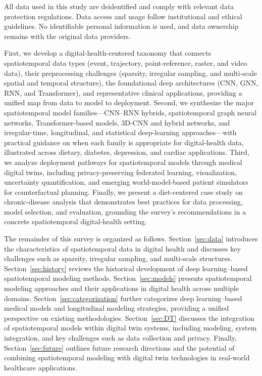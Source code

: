 \documentclass[acmsmall]{acmart}
\begin{document}
All data used in this study are deidentified and comply with relevant data protection regulations. Data access and usage follow institutional and ethical guidelines. No identifiable personal information is used, and data ownership remains with the original data providers.

First, we develop a digital-health-centered taxonomy that connects spatiotemporal data types (event, trajectory, point-reference, raster, and video data), their preprocessing challenges (sparsity, irregular sampling, and multi-scale spatial and temporal structure), the foundational deep architectures (CNN, GNN, RNN, and Transformer), and representative clinical applications, providing a unified map from data to model to deployment. Second, we synthesize the major spatiotemporal model families---CNN--RNN hybrids, spatiotemporal graph neural networks, Transformer-based models, 3D-CNN and hybrid networks, and irregular-time, longitudinal, and statistical deep-learning approaches---with practical guidance on when each family is appropriate for digital-health data, illustrated across dietary, diabetes, depression, and cardiac applications. Third, we analyze deployment pathways for spatiotemporal models through medical digital twins, including privacy-preserving federated learning, visualization, uncertainty quantification, and emerging world-model-based patient simulators for counterfactual planning. Finally, we present a diet-centered case study on chronic-disease analysis that demonstrates best practices for data processing, model selection, and evaluation, grounding the survey's recommendations in a concrete spatiotemporal digital-health setting.


The remainder of this survey is organized as follows. 
Section~\ref{sec:data} introduces the characteristics of spatiotemporal data in digital health and discusses key challenges such as sparsity, irregular sampling, and multi-scale structures. 
Section~\ref{sec:history} reviews the historical development of deep learning–based spatiotemporal modeling methods.
Section~\ref{sec:models} presents spatiotemporal modeling approaches and their applications in digital health across multiple domains. 
Section~\ref{sec:categorization} further categorizes deep learning–based medical models and longitudinal modeling strategies, providing a unified perspective on existing methodologies.
Section~\ref{sec:DT} discusses the integration of spatiotemporal models within digital twin systems, including modeling, system integration, and key challenges such as data collection and privacy. 
Finally, Section~\ref{sec:future} outlines future research directions and the potential of combining spatiotemporal modeling with digital twin technologies in real-world healthcare applications.
\end{document}
